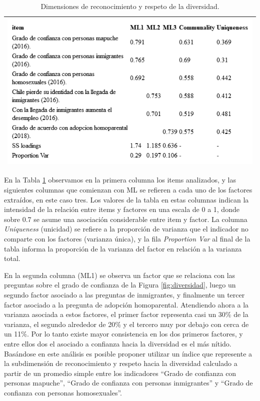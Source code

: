 \documentclass[
  12pt,
]{book}
\begin{document}
\begin{longtable}[]{@{}l@{}}
\caption{\label{tab:div-fa}Dimensiones de reconocimiento y respeto de la diversidad.}\tabularnewline
\toprule
\endhead
\includegraphics[width=8.33333in,height=\textheight]{output/tables/div_fa.png}\tabularnewline
\bottomrule
\end{longtable}

En la Tabla \ref{tab:div-fa} observamos en la primera columna los items analizados, y las siguientes columnas que comienzan con ML se refieren a cada uno de los factores extraídos, en este caso tres. Los valores de la tabla en estas columnas indican la intensidad de la relación entre items y factores en una escala de 0 a 1, donde sobre 0.7 se asume una asociación considerable entre item y factor. La columna \emph{Uniqueness} (unicidad) se refiere a la proporción de varianza que el indicador no comparte con los factores (varianza única), y la fila \emph{Proportion Var} al final de la tabla informa la proporción de la varianza del factor en relación a la varianza total.

En la segunda columna (ML1) se observa un factor que se relaciona con las preguntas sobre el grado de confianza de la Figura \ref{fig:diversidad}, luego un segundo factor asociado a las preguntas de inmigrantes, y finalmente un tercer factor asociado a la pregunta de adopción homoparental. Atendiendo ahora a la varianza asociada a estos factores, el primer factor representa casi un 30\% de la varianza, el segundo alrededor de 20\% y el tercero muy por debajo con cerca de un 11\%. Por lo tanto existe mayor consistencia en los dos primeros factores, y entre ellos dos el asociado a confianza hacia la diversidad es el más nítido. Basándose en este análisis es posible proponer utilizar un índice que represente a la subdimensión de reconocimiento y respeto hacia la diversidad calculado a partir de un promedio simple entre los indicadores ``Grado de confianza con personas mapuche'', ``Grado de confianza con personas inmigrantes'' y ``Grado de confianza con personas homosexuales''.
\end{document}
